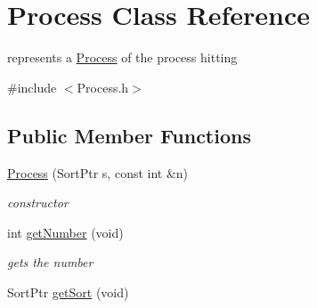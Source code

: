 \hypertarget{class_process}{\section{\-Process \-Class \-Reference}
\label{class_process}
}


represents a \hyperlink{class_process}{\-Process} of the process hitting  




{\ttfamily \#include $<$\-Process.\-h$>$}

\subsection*{\-Public \-Member \-Functions}
\begin{DoxyCompactItemize}
\item 
\hyperlink{class_process_a267617e8f2cfd994e0527635372be90c}{\-Process} (\-Sort\-Ptr s, const int \&n)
\begin{DoxyCompactList}\small\item\em constructor \end{DoxyCompactList}\item 
\hypertarget{class_process_acdfa357f41df6f1e09cdffbc5c5b2c3b}{int \hyperlink{class_process_acdfa357f41df6f1e09cdffbc5c5b2c3b}{get\-Number} (void)}\label{class_process_acdfa357f41df6f1e09cdffbc5c5b2c3b}

\begin{DoxyCompactList}\small\item\em gets the number \end{DoxyCompactList}\item 
\hypertarget{class_process_aaabe803350e1d6dcc23d8aa4ff2314db}{\-Sort\-Ptr \hyperlink{class_process_aaabe803350e1d6dcc23d8aa4ff2314db}{get\-Sort} (void)}\label{class_process_aaabe803350e1d6dcc23d8aa4ff2314db}


\end{DoxyCompactItemize}
